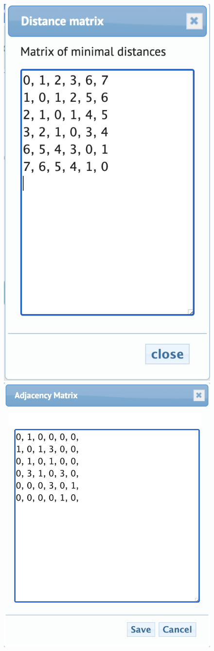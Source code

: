 \begin{figure}[h]
\centering
\begin{minipage}{.3\textwidth}
\centering
\includegraphics[width=0.65\linewidth]{img/DistanceMatrix}

\end{minipage}%
\begin{minipage}{.3\textwidth}
\centering
\includegraphics[width=0.85\linewidth]{img/AdjacencyMatrix}


\end{minipage}
\end{figure}
